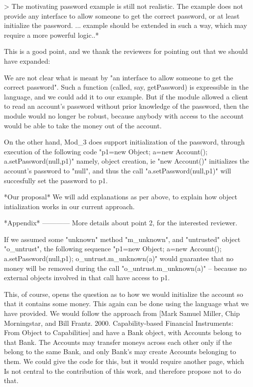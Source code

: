 > The motivating password example is still not realistic. The example does not 
provide any interface to allow someone to get the correct password, or at 
least initialize the password. ... example should be extended in such a way, 
which may require a more powerful logic..*

This is a good point, and we thank the reviewers for pointing out that we should
have expanded:

We are not clear what is meant by "an interface to allow someone to get the 
correct password". Such a function (called, say, getPassword) is expressible
in the language, and we could add it to our example. But if the module allowed 
a client to read an account's password without prior knowledge of the password, 
then the module would no longer be robust, because anybody with access to
the account would be able to take the money out of the account. 

On the other hand, Mod_3 does support initialization of the password, through
execution of the following code
	"p1=new Object; a=new Account(); a.setPassword(null,p1)"
namely, object creation, ie "new Account()" initializes the account's password
to "null", and thus the call "a.setPassword(null,p1)" will succesfully set the password
to p1. 

*Our proposal* 
We will add explanations as per above, to explain how object intialization works 
in our current approach. 

*Appendix*
------------
More details about point 2, for the interested reviewer.

If we assumed some "unknown" method "m_unknown", and "untrusted" 
object "o_untrust", the following sequence
        "p1=new Object; a=new Account(); a.setPassword(null,p1); o_untrust.m_unknown(a)"
would guarantee that no money will be removed during the call "o_untrust.m_unknown(a)"
-- because no external objects involved in that call have access to p1.  

This, of course, opens the question as to how we would initialize the account 
so that it contains some money. This again can be done using the language what we have
provided. We would follow the approach from [Mark Samuel Miller, Chip Morningstar, and Bill 
Frantz. 2000. Capability-based Financial Instruments: From Object to Capabilities] and have a 
Bank object, with Accounts belong to that Bank. The Accounts may transfer moneys across 
each other only if the belong to the same Bank, and only Bank's may create Accounts 
belonging to them. We could give the code for this, but it would require another page, which
Is not central to the contribution of this work, and therefore propose not to do that.
	
 

